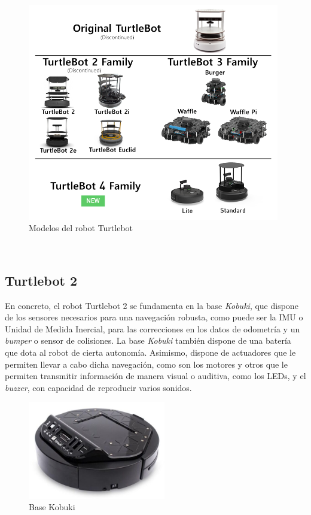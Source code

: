 \begin{figure} [h!]
  \begin{center}
    \includegraphics[width=11cm]{figs/turtlebot_family}
  \end{center}
  \caption{Modelos del robot Turtlebot \cite{turtlebot4}}
  \label{fig:turtlebots}
\end{figure}\

\subsection{Turtlebot 2}
\label{sec:turtlebot2}

En concreto, el robot Turtlebot 2 se fundamenta en la base \textit{Kobuki}, que
dispone de los sensores necesarios para una navegación robusta, como puede ser
la IMU o Unidad de Medida Inercial, para las correcciones en los datos de
odometría y un \textit{bumper} o sensor de colisiones.
La base \textit{Kobuki} también dispone de una batería que dota al robot de
cierta autonomía.
Asimismo, dispone de actuadores que le permiten llevar a cabo dicha navegación,
como son los motores y otros que le permiten transmitir información de manera
visual o auditiva, como los LEDs, y el \textit{buzzer}, con capacidad de
reproducir varios sonidos.
\\

\begin{figure} [h!]
  \begin{center}
    \includegraphics[width=6cm]{figs/kobuki_base}
  \end{center}
  \caption{Base Kobuki \cite{kobuki_base}}
  \label{fig:base_kobuki}
\end{figure}\

